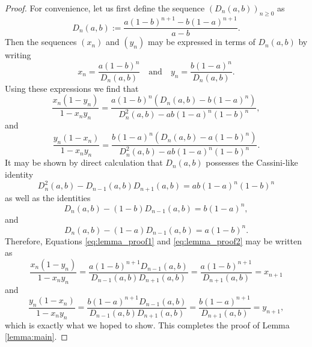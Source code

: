 \documentclass[10pt]{article}
\theoremstyle{definition}
\begin{document}
\begin{proof}
    For convenience, let us first define the sequence $(D_{n}(a,b))_{n\geq 0}$ as
    \begin{equation*}
        D_{n}(a,b) := \frac{a(1-b)^{n+1} - b(1-a)^{n+1}}{a-b}.
    \end{equation*}
    Then the sequences $(x_{n})$ and $(y_{n})$ may be expressed in terms of $D_{n}(a,b)$ by writing
    \begin{equation*}
        x_{n} = \frac{a(1-b)^n}{D_n(a,b)} \quad \text{and} \quad  y_{n} = \frac{b(1-a)^n}{D_{n}(a,b)}.
    \end{equation*}
    Using these expressions we find that
    \begin{equation}
        \frac{x_n(1-y_n)}{1-x_n y_n} = \frac{a(1-b)^n(D_n(a,b)-b(1-a)^n)}{D^2_n(a,b) - ab(1-a)^n(1-b)^n}, \label{eq:lemma_proof1}
    \end{equation}
    and 
    \begin{equation}
        \frac{y_n(1-x_n)}{1-x_n y_n} = \frac{b(1-a)^n(D_n(a,b)-a(1-b)^n)}{D^2_n(a,b) - ab(1-a)^n(1-b)^n}. \label{eq:lemma_proof2}
    \end{equation}
    It may be shown by direct calculation that $D_{n}(a,b)$ possesses the Cassini-like identity
    \begin{equation*}
        D^2_n(a,b) -  D_{n-1}(a,b)D_{n+1}(a,b) = ab(1-a)^n(1-b)^n
    \end{equation*}
    as well as the identities 
    \begin{equation*}
        D_n(a,b)- (1-b)D_{n-1}(a,b)= b(1-a)^n,
    \end{equation*}
    and 
    \begin{equation*}
        D_n(a,b)-(1-a)D_{n-1}(a,b) =  a(1-b)^n.
    \end{equation*}
    Therefore, Equations \eqref{eq:lemma_proof1} and \eqref{eq:lemma_proof2} may be written as
    \begin{equation*}
        \frac{x_n(1-y_n)}{1-x_n y_n} = \frac{a(1-b)^{n+1}D_{n-1}(a,b)}{D_{n-1}(a,b)D_{n+1}(a,b)} = \frac{a(1-b)^{n+1}}{D_{n+1}(a,b)} = x_{n+1}
    \end{equation*}
    and
    \begin{equation*}
        \frac{y_n(1-x_n)}{1-x_n y_n} = \frac{b(1-a)^{n+1}D_{n-1}(a,b)}{D_{n-1}(a,b)D_{n+1}(a,b)} = \frac{b(1-a)^{n+1}}{D_{n+1}(a,b)} = y_{n+1},
    \end{equation*}
    which is exactly what we hoped to show.  This completes the proof of Lemma \ref{lemma:main}.
\end{proof}
\end{document}
